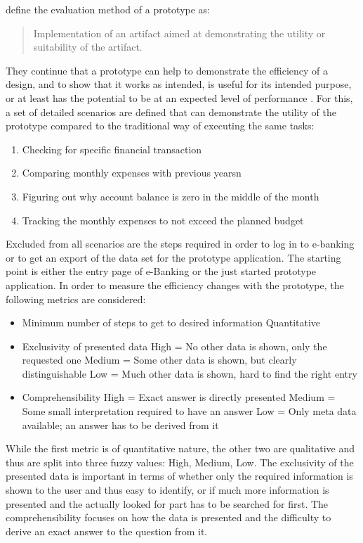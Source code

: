 \newcommand{\scenone}{Checking for specific financial transaction}
\newcommand{\scentwo}{Comparing monthly expenses with previous yearsn}
\newcommand{\scenthree}{Figuring out why  account balance is zero in the middle of the month}
\newcommand{\scenfour}{Tracking the monthly expenses to not exceed the planned budget}

\citet[p.4]{Peffers2012} define the evaluation method of a prototype as: \blockquote{Implementation of an artifact aimed at demonstrating the utility or suitability of the artifact.} They continue that a prototype can help to demonstrate the efficiency of a design, and to show that it works as intended, is useful for its intended purpose, or at least has the potential to be at an expected level of performance \citep{Peffers2012}. For this, a set of detailed scenarios are defined that can demonstrate the utility of the prototype compared to the traditional way of executing the same tasks:
\begin{enumerate}
	\item \scenone
	\item \scentwo
	\item \scenthree
	\item \scenfour
\end{enumerate}
Excluded from all scenarios are the steps required in order to log in to e-banking or to get an export of the data set for the prototype application. The starting point is either the entry page of e-Banking or the just started prototype application. In order to measure the efficiency changes with the prototype, the following metrics are considered:
\begin{itemize}[noitemsep,nolistsep]
	\item Minimum number of steps to get to desired information
		\subitem Quantitative
	\item Exclusivity of presented data
		\subitem High = No other data is shown, only the requested one
		\subitem Medium = Some other data is shown, but clearly distinguishable
		\subitem Low = Much other data is shown, hard to find the right entry
	\item Comprehensibility
		\subitem High = Exact answer is directly presented
		\subitem Medium = Some small interpretation required to have an answer
		\subitem Low = Only meta data available; an answer has to be derived from it
\end{itemize}
While the first metric is of quantitative nature, the other two are qualitative and thus are split into three fuzzy values: High, Medium, Low. The exclusivity of the presented data is important in terms of whether only the required information is shown to the user and thus easy to identify, or if much more information is presented and the actually looked for part has to be searched for first. The comprehensibility focuses on how the data is presented and the difficulty to derive an exact answer to the question from it. \newline
